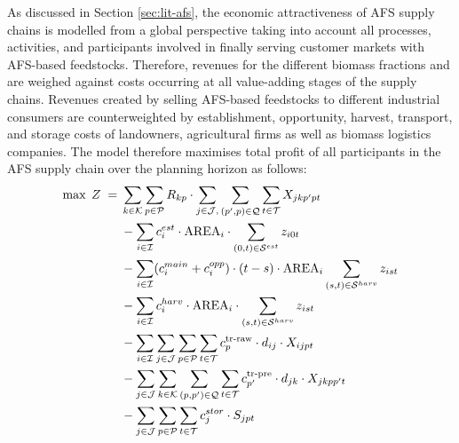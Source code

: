 \documentclass[preprint,review,1p,authoryear]{elsarticle} %
\newcommand{\Sc}{\mathcal{S}}
\newcommand{\Ic}{\mathcal{I}}
\begin{document}
As discussed in Section \ref{sec:lit-afs}, the economic attractiveness of AFS supply chains is modelled from a global perspective taking into account all processes, activities, and participants involved in finally serving customer markets with AFS-based feedstocks. Therefore, revenues for the different biomass fractions and are weighed against costs occurring at all value-adding stages of the supply chains. Revenues created by selling AFS-based feedstocks to different industrial consumers are counterweighted by establishment, opportunity, harvest, transport, and storage costs of landowners, agricultural firms as well as biomass logistics companies. The model therefore maximises total profit of all participants in the AFS supply chain over the planning horizon as follows:
\begin{align}
\max\; Z \;=\;&
  \sum_{k \in \mathcal{K}}\sum_{p \in \mathcal{P}} R_{kp} \cdot \sum_{j \in \mathcal{J}, }\sum_{(p',p) \in \mathcal{Q}} \sum_{t \in \mathcal{T}}  X_{jkp'pt}  \label{eq:obj-revenue} \\
&- \sum_{i \in \mathcal{I}} c^{{est}}_i \cdot \text{AREA}_i  \cdot\sum_{(0,t) \in \mathcal{S}^{{est}}} z_{i0t} \notag \\
&- \sum_{i \in \mathcal{I}} (c^{main}_{i} + c^{{opp}}_i) \cdot (t-s) \cdot \text{AREA}_i \sum_{(s,t) \in \mathcal{S}^{{harv}}} z_{ist} \notag \\
&- \sum_{i \in \mathcal{I}} c^{{harv}}_i \cdot \text{AREA}_i \cdot \sum_{(s,t) \in \mathcal{S}^{{harv}}} z_{ist} \notag \\
&- \sum_{i \in \mathcal{I}}\sum_{j \in \mathcal{J}}\sum_{p \in \mathcal{P}}\sum_{t \in \mathcal{T}} c^{\text{tr-raw}}_p \cdot d_{ij} \cdot X_{ijpt} \notag \\
&- \sum_{j \in \mathcal{J}}\sum_{k \in \mathcal{K}}\sum_{(p,p') \in \mathcal{Q}} \sum_{t \in \mathcal{T}} c^{\text{tr-pre}}_{p'} \cdot d_{jk} \cdot X_{jkpp't} \notag \\
&- \sum_{j \in \mathcal{J}}\sum_{p \in \mathcal{P}}\sum_{t \in \mathcal{T}}  c^{{stor}}_j \cdot S_{jpt}  \notag
\end{align}
\end{document}
